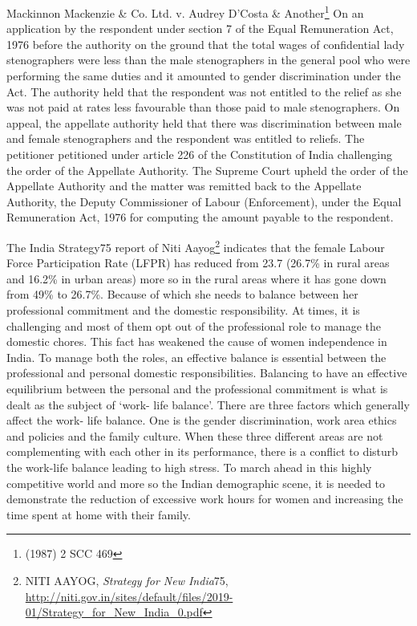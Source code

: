 \begin{multicols}{2}
\noi
Mackinnon Mackenzie \& Co. Ltd. v. Audrey D’Costa \& Another\footnote{(1987) 2 SCC 469} On an application by the
respondent under section 7 of the Equal Remuneration Act, 1976 before the authority on the
ground that the total wages of confidential lady stenographers were less than the male
stenographers in the general pool who were performing the same duties and it amounted to
gender discrimination under the Act. The authority held that the respondent was not entitled
to the relief as she was not paid at rates less favourable than those paid to male stenographers.
On appeal, the appellate authority held that there was discrimination between male and
female stenographers and the respondent was entitled to reliefs. The petitioner petitioned
under article 226 of the Constitution of India challenging the order of the Appellate
Authority. The Supreme Court upheld the order of the Appellate Authority and the matter
was remitted back to the Appellate Authority, the Deputy Commissioner of Labour
(Enforcement), under the Equal Remuneration Act, 1976 for computing the amount payable
to the respondent.

\vspace{.15cm}


\vspace{.15cm}

\noi
The India Strategy\@75 report of Niti Aayog\footnote{NITI AAYOG, \textit{Strategy for New India}\@75, \url{http://niti.gov.in/sites/default/files/2019- 01/Strategy_for_New_India_0.pdf}} indicates that the female Labour Force
Participation Rate (LFPR) has reduced from 23.7 (26.7\% in rural areas and 16.2\% in urban areas) more so in the rural areas where it has gone down from 49\% to 26.7\%. Because of which she needs to balance between her professional commitment and the domestic
responsibility. At times, it is challenging and most of them opt out of the professional role to
manage the domestic chores. This fact has weakened the cause of women independence in
India. To manage both the roles, an effective balance is essential between the professional
and personal domestic responsibilities. Balancing to have an effective equilibrium between
the personal and the professional commitment is what is dealt as the subject of ‘work- life
balance’. There are three factors which generally affect the work- life balance. One is the
gender discrimination, work area ethics and policies and the family culture. When these three
different areas are not complementing with each other in its performance, there is a conflict to
disturb the work-life balance leading to high stress. To march ahead in this highly
competitive world and more so the Indian demographic scene, it is needed to demonstrate the
reduction of excessive work hours for women and increasing the time spent at home with
their family.


\end{multicols}
